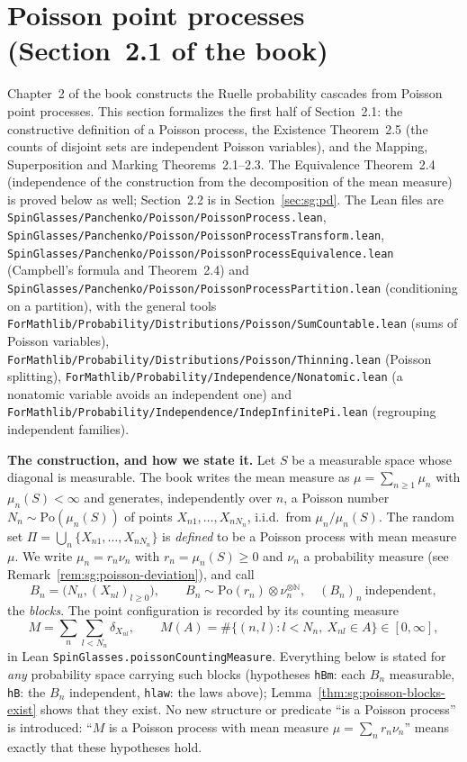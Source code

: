 \section{Poisson point processes (Section~2.1 of the book)}\label{sec:sg:poisson}

Chapter~2 of the book constructs the Ruelle probability cascades from Poisson point processes. This section formalizes
the first half of Section~2.1: the constructive definition of a Poisson process, the Existence Theorem~2.5 (the counts of disjoint sets are
independent Poisson variables), and the Mapping, Superposition and Marking Theorems~2.1--2.3. The Equivalence Theorem~2.4 (independence of the
construction from the decomposition of the mean measure) is proved below as well; Section~2.2 is in Section~\ref{sec:sg:pd}.
The Lean files are \texttt{SpinGlasses/Panchenko/Poisson/PoissonProcess.lean}, \texttt{SpinGlasses/Panchenko/Poisson/PoissonProcessTransform.lean}, \texttt{SpinGlasses/Panchenko/Poisson/PoissonProcessEquivalence.lean} (Campbell's formula and Theorem~2.4) and \texttt{SpinGlasses/Panchenko/Poisson/PoissonProcessPartition.lean} (conditioning on a partition), with the general tools
\texttt{ForMathlib/Probability/Distributions/Poisson/SumCountable.lean} (sums of Poisson variables),
\texttt{ForMathlib/Probability/Distributions/Poisson/Thinning.lean} (Poisson splitting),
\texttt{ForMathlib/Probability/Independence/Nonatomic.lean} (a nonatomic variable avoids an independent one) and
\texttt{ForMathlib/Probability/Independence/IndepInfinitePi.lean} (regrouping independent families).

\medskip\noindent\textbf{The construction, and how we state it.}
Let $S$ be a measurable space whose diagonal is measurable. The book writes the mean measure as $\mu=\sum_{n\ge1}\mu_n$ with $\mu_n(S)<\infty$ and
generates, independently over $n$, a Poisson number $N_n\sim\mathrm{Po}(\mu_n(S))$ of points $X_{n1},\dots,X_{nN_n}$, i.i.d.\ from $\mu_n/\mu_n(S)$.
The random set $\Pi=\bigcup_n\{X_{n1},\dots,X_{nN_n}\}$ is \emph{defined} to be a Poisson process with mean measure $\mu$.
We write $\mu_n=r_n\nu_n$ with $r_n=\mu_n(S)\ge0$ and $\nu_n$ a probability measure (see Remark~\ref{rem:sg:poisson-deviation}), and call
\[B_n=\big(N_n,(X_{nl})_{l\ge0}\big),\qquad B_n\sim \mathrm{Po}(r_n)\otimes\nu_n^{\otimes\mathbb N},\quad (B_n)_n\ \text{independent},\]
the \emph{blocks}. The point configuration is recorded by its counting measure
\[M=\sum_{n}\sum_{l<N_n}\delta_{X_{nl}},\qquad M(A)=\#\{(n,l):l<N_n,\ X_{nl}\in A\}\in[0,\infty],\]
in Lean \texttt{SpinGlasses.poissonCountingMeasure}. Everything below is stated for \emph{any} probability space carrying such blocks
(hypotheses \texttt{hBm}: each $B_n$ measurable, \texttt{hB}: the $B_n$ independent, \texttt{hlaw}: the laws above);
Lemma~\ref{thm:sg:poisson-blocks-exist} shows that they exist. No new structure or predicate ``is a Poisson process'' is introduced:
``$M$ is a Poisson process with mean measure $\mu=\sum_n r_n\nu_n$'' means exactly that these hypotheses hold.

